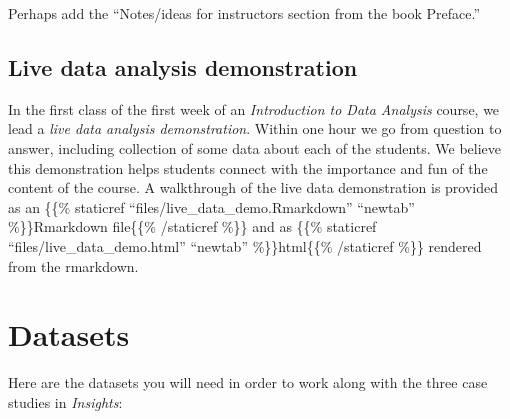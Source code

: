 \documentclass[]{book}
\begin{document}
Perhaps add the ``Notes/ideas for instructors section from the book Preface.''

\hypertarget{live-data-demo}{%
\subsection{Live data analysis demonstration}\label{live-data-demo}}

In the first class of the first week of an \emph{Introduction to Data Analysis} course, we lead a \emph{live data analysis demonstration}. Within one hour we go from question to answer, including collection of some data about each of the students. We believe this demonstration helps students connect with the importance and fun of the content of the course. A walkthrough of the live data demonstration is provided as an \{\{\% staticref ``files/live\_data\_demo.Rmarkdown'' ``newtab'' \%\}\}Rmarkdown file\{\{\% /staticref \%\}\} and as \{\{\% staticref ``files/live\_data\_demo.html'' ``newtab'' \%\}\}html\{\{\% /staticref \%\}\} rendered from the rmarkdown.

\hypertarget{datasets}{%
\section{Datasets}\label{datasets}}

Here are the datasets you will need in order to work along with the three case studies in \emph{Insights}:
\end{document}
